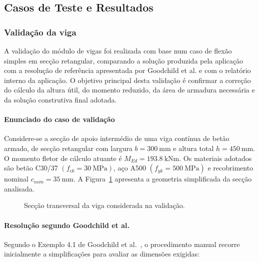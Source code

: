 \subsection{Casos de Teste e Resultados}

\subsubsection{Validação da viga}

A validação do módulo de vigas foi realizada com base num caso de flexão simples em secção retangular, comparando a solução produzida pela aplicação com a resolução de referência apresentada por Goodchild et al. \cite{Goodchild} e com o relatório interno da aplicação. O objetivo principal desta validação é confirmar a correção do cálculo da altura útil, do momento reduzido, da área de armadura necessária e da solução construtiva final adotada.

\paragraph{Enunciado do caso de validação}

Considere-se a secção de apoio intermédio de uma viga contínua de betão armado, de secção retangular com largura \(b = 300\ \text{mm}\) e altura total \(h = 450\ \text{mm}\). O momento fletor de cálculo atuante é \(M_{Ed} = 193.8\ \text{kNm}\). Os materiais adotados são betão C30/37 \((f_{ck}=30\ \text{MPa})\), aço A500 \((f_{yk}=500\ \text{MPa})\) e recobrimento nominal \(c_{nom}=35\ \text{mm}\). A Figura~\ref{fig:viga_validacao} apresenta a geometria simplificada da secção analisada.

\begin{figure}[H]
\centering
{}
\caption{Secção transversal da viga considerada na validação.}
\label{fig:viga_validacao}
\end{figure}

\paragraph{Resolução segundo Goodchild et al.}

Segundo o Exemplo 4.1 de Goodchild et al.~\cite{Goodchild}, o procedimento manual recorre inicialmente a simplificações para avaliar as dimensões exigidas:

